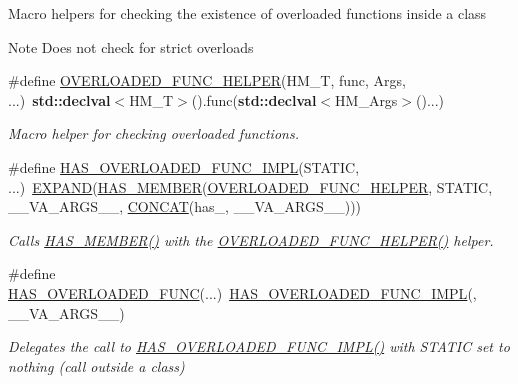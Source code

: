 \label{_amgrp01747264fe7bf50731df0522c351974e}%
Macro helpers for checking the existence of overloaded functions inside a class

\begin{DoxyNote}{Note}
Does not check for strict overloads 
\end{DoxyNote}
\begin{DoxyCompactItemize}
\item 
\#define \hyperlink{group__HasMemberGroup_ga2c2cbdd600b265973cedcbd7d50df8e7}{O\+V\+E\+R\+L\+O\+A\+D\+E\+D\+\_\+\+F\+U\+N\+C\+\_\+\+H\+E\+L\+P\+ER}(H\+M\+\_\+T,  func,  Args, ...)~{\bf std\+::declval}$<$H\+M\+\_\+T$>$().func({\bf std\+::declval}$<$H\+M\+\_\+\+Args$>$()...)
\begin{DoxyCompactList}\small\item\em Macro helper for checking overloaded functions. \end{DoxyCompactList}\item 
\#define \hyperlink{group__HasMemberGroup_gaae550ab3ce508ae2feb5fccabcaea0f8}{H\+A\+S\+\_\+\+O\+V\+E\+R\+L\+O\+A\+D\+E\+D\+\_\+\+F\+U\+N\+C\+\_\+\+I\+M\+PL}(S\+T\+A\+T\+IC, ...)~\hyperlink{ZipIter_2Helpers_8h_aa35fecfa6a93ec3fdb4a3776f873be27}{E\+X\+P\+A\+ND}(\hyperlink{group__HasMemberGroup_ga37993e5e75a0249077679e4776e89085}{H\+A\+S\+\_\+\+M\+E\+M\+B\+ER}(\hyperlink{group__HasMemberGroup_ga2c2cbdd600b265973cedcbd7d50df8e7}{O\+V\+E\+R\+L\+O\+A\+D\+E\+D\+\_\+\+F\+U\+N\+C\+\_\+\+H\+E\+L\+P\+ER}, S\+T\+A\+T\+IC, \+\_\+\+\_\+\+V\+A\+\_\+\+A\+R\+G\+S\+\_\+\+\_\+, \hyperlink{ZipIter_2Helpers_8h_a2f18db18bca26cafa95e9719de4a41ef}{C\+O\+N\+C\+AT}(has\+\_\+, \+\_\+\+\_\+\+V\+A\+\_\+\+A\+R\+G\+S\+\_\+\+\_\+)))
\begin{DoxyCompactList}\small\item\em Calls \hyperlink{group__HasMemberGroup_ga37993e5e75a0249077679e4776e89085}{H\+A\+S\+\_\+\+M\+E\+M\+B\+E\+R()} with the \hyperlink{group__HasMemberGroup_ga2c2cbdd600b265973cedcbd7d50df8e7}{O\+V\+E\+R\+L\+O\+A\+D\+E\+D\+\_\+\+F\+U\+N\+C\+\_\+\+H\+E\+L\+P\+E\+R()} helper. \end{DoxyCompactList}\item 
\#define \hyperlink{group__HasMemberGroup_ga39d708fd02cbbba1ef5db4a5f46fe317}{H\+A\+S\+\_\+\+O\+V\+E\+R\+L\+O\+A\+D\+E\+D\+\_\+\+F\+U\+NC}(...)~\hyperlink{group__HasMemberGroup_gaae550ab3ce508ae2feb5fccabcaea0f8}{H\+A\+S\+\_\+\+O\+V\+E\+R\+L\+O\+A\+D\+E\+D\+\_\+\+F\+U\+N\+C\+\_\+\+I\+M\+PL}(, \+\_\+\+\_\+\+V\+A\+\_\+\+A\+R\+G\+S\+\_\+\+\_\+)
\begin{DoxyCompactList}\small\item\em Delegates the call to \hyperlink{group__HasMemberGroup_gaae550ab3ce508ae2feb5fccabcaea0f8}{H\+A\+S\+\_\+\+O\+V\+E\+R\+L\+O\+A\+D\+E\+D\+\_\+\+F\+U\+N\+C\+\_\+\+I\+M\+P\+L()} with {\ttfamily S\+T\+A\+T\+IC} set to nothing (call outside a class) \end{DoxyCompactList}\item 

\end{DoxyCompactItemize}
